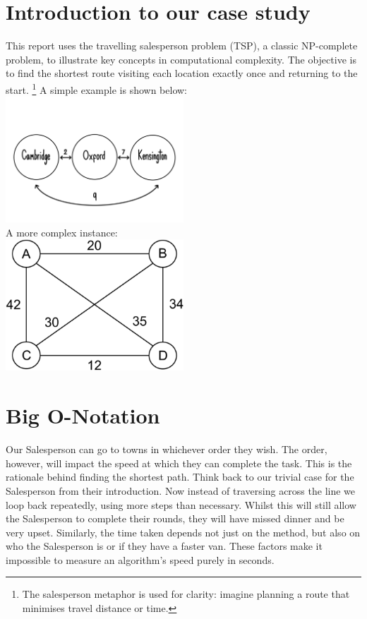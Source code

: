 \documentclass[12pt]{report}
\begin{document}
\section{Introduction to our case study}
This report uses the travelling salesperson problem (TSP), a classic NP-complete problem, to illustrate key concepts in computational complexity. The objective is to find the shortest route visiting each location exactly once and returning to the start.%
\footnote{The salesperson metaphor is used for clarity: imagine planning a route that minimises travel distance or time.}
A simple example is shown below:\\
\includegraphics[width=0.5\textwidth]{trivialTSP.png}\\
\vspace{0.5cm}
A more complex instance:\\
\includegraphics[width=0.5\textwidth]{HarderTSP.png}

\section{Big O-Notation}
Our Salesperson can go to towns in whichever order they wish.
The order, however, will impact the speed at which they can complete the task.
This is the rationale behind finding the shortest path.
Think back to our trivial case for the Salesperson from their introduction.
Now instead of traversing across the line we loop back repeatedly, using more steps than necessary.
Whilst this will still allow the Salesperson to complete their rounds, they will have missed dinner and be very upset.
Similarly, the time taken depends not just on the method, but also on who the Salesperson is or if they have a faster van.
These factors make it impossible to measure an algorithm's speed purely in seconds.
\end{document}
